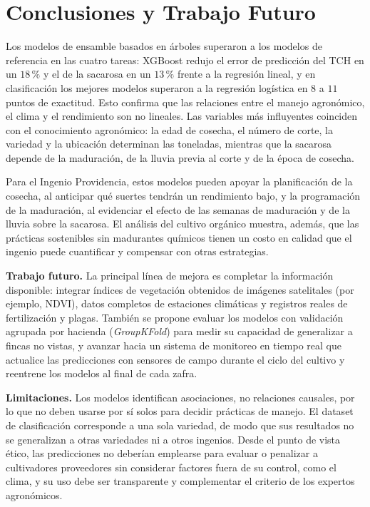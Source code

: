 \documentclass[conference]{IEEEtran}
\begin{document}
\section{Conclusiones y Trabajo Futuro}
Los modelos de ensamble basados en árboles superaron a los modelos de referencia en las cuatro tareas: XGBoost redujo el error de predicción del TCH en un $18\,\%$ y el de la sacarosa en un $13\,\%$ frente a la regresión lineal, y en clasificación los mejores modelos superaron a la regresión logística en $8$ a $11$ puntos de exactitud. Esto confirma que las relaciones entre el manejo agronómico, el clima y el rendimiento son no lineales. Las variables más influyentes coinciden con el conocimiento agronómico: la edad de cosecha, el número de corte, la variedad y la ubicación determinan las toneladas, mientras que la sacarosa depende de la maduración, de la lluvia previa al corte y de la época de cosecha.

Para el Ingenio Providencia, estos modelos pueden apoyar la planificación de la cosecha, al anticipar qué suertes tendrán un rendimiento bajo, y la programación de la maduración, al evidenciar el efecto de las semanas de maduración y de la lluvia sobre la sacarosa. El análisis del cultivo orgánico muestra, además, que las prácticas sostenibles sin madurantes químicos tienen un costo en calidad que el ingenio puede cuantificar y compensar con otras estrategias.

\textbf{Trabajo futuro.} La principal línea de mejora es completar la información disponible: integrar índices de vegetación obtenidos de imágenes satelitales (por ejemplo, NDVI), datos completos de estaciones climáticas y registros reales de fertilización y plagas. También se propone evaluar los modelos con validación agrupada por hacienda (\textit{GroupKFold}) para medir su capacidad de generalizar a fincas no vistas, y avanzar hacia un sistema de monitoreo en tiempo real que actualice las predicciones con sensores de campo durante el ciclo del cultivo y reentrene los modelos al final de cada zafra.

\textbf{Limitaciones.} Los modelos identifican asociaciones, no relaciones causales, por lo que no deben usarse por sí solos para decidir prácticas de manejo. El dataset de clasificación corresponde a una sola variedad, de modo que sus resultados no se generalizan a otras variedades ni a otros ingenios. Desde el punto de vista ético, las predicciones no deberían emplearse para evaluar o penalizar a cultivadores proveedores sin considerar factores fuera de su control, como el clima, y su uso debe ser transparente y complementar el criterio de los expertos agronómicos.
\end{document}
